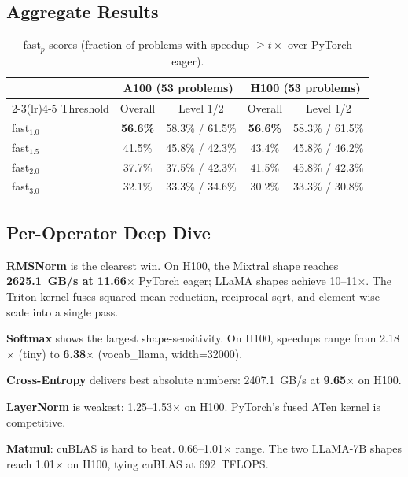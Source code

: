 \documentclass[11pt]{article}
\begin{document}
\subsection{Aggregate Results}
\label{sec:aggregate}

\begin{table}[t]
\centering
\caption{fast$_p$ scores (fraction of problems with speedup $\geq t\times$ over PyTorch eager).}
\label{tab:fastp}
\small
\begin{tabular}{@{}lcccc@{}}
\toprule
 & \multicolumn{2}{c}{A100 (53 problems)} & \multicolumn{2}{c}{H100 (53 problems)} \\
\cmidrule(lr){2-3}\cmidrule(lr){4-5}
Threshold & Overall & Level 1/2 & Overall & Level 1/2 \\
\midrule
fast$_{1.0}$ & \textbf{56.6\%} & 58.3\% / 61.5\% & \textbf{56.6\%} & 58.3\% / 61.5\% \\
fast$_{1.5}$ & 41.5\% & 45.8\% / 42.3\% & 43.4\% & 45.8\% / 46.2\% \\
fast$_{2.0}$ & 37.7\% & 37.5\% / 42.3\% & 41.5\% & 45.8\% / 42.3\% \\
fast$_{3.0}$ & 32.1\% & 33.3\% / 34.6\% & 30.2\% & 33.3\% / 30.8\% \\
\bottomrule
\end{tabular}
\end{table}


\subsection{Per-Operator Deep Dive}
\label{sec:per-operator}

\textbf{RMSNorm} is the clearest win. On H100, the Mixtral shape reaches
\textbf{2625.1~GB/s at 11.66$\times$} PyTorch eager; LLaMA shapes achieve
10--11$\times$. The Triton kernel fuses squared-mean reduction, reciprocal-sqrt,
and element-wise scale into a single pass.

\textbf{Softmax} shows the largest shape-sensitivity. On H100, speedups range
from 2.18$\times$ (tiny) to \textbf{6.38$\times$} (vocab\_llama, width=32000).

\textbf{Cross-Entropy} delivers best absolute numbers: 2407.1~GB/s at
\textbf{9.65$\times$} on H100.

\textbf{LayerNorm} is weakest: 1.25--1.53$\times$ on H100. PyTorch's fused ATen
kernel is competitive.

\textbf{Matmul}: cuBLAS is hard to beat. 0.66--1.01$\times$ range. The two
LLaMA-7B shapes reach 1.01$\times$ on H100, tying cuBLAS at 692~TFLOPS.
\end{document}
